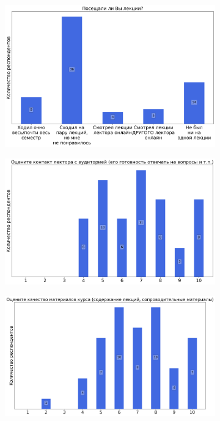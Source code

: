 		\begin{figure}[H]
			\centering
            \begin{subfigure}[b]{0.45\textwidth}
				\centering
				\includegraphics[width=\textwidth]{images/1 course/Дискретный анализ/lecturer-questions-Ильинский Д.Г.-0.png}
			\end{subfigure}
			\begin{subfigure}[b]{0.45\textwidth}
				\centering
				\includegraphics[width=\textwidth]{images/1 course/Дискретный анализ/lecturer-marks-Ильинский Д.Г.-0.png}
			\end{subfigure}
			\begin{subfigure}[b]{0.45\textwidth}
				\centering
				\includegraphics[width=\textwidth]{images/1 course/Дискретный анализ/lecturer-marks-Ильинский Д.Г.-1.png}

\end{subfigure}
\end{figure}

